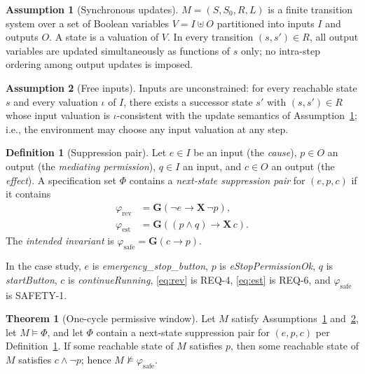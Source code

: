 \documentclass{ieeeaccess}
\theoremstyle{definition}
\newtheorem{definition}{Definition}
\newtheorem{theorem}{Theorem}
\newtheorem{assumption}{Assumption}
\newcommand{\G}{\mathbf{G}}
\newcommand{\X}{\mathbf{X}}
\begin{document}
\begin{assumption}[Synchronous updates]
\label{ass:sync}
$M=(S,S_0,R,L)$ is a finite transition system over a set of Boolean variables $V = I \uplus O$ partitioned into inputs $I$ and outputs $O$. A state is a valuation of $V$. In every transition $(s,s') \in R$, all output variables are updated simultaneously as functions of $s$ only; no intra-step ordering among output updates is imposed.
\end{assumption}

\begin{assumption}[Free inputs]
\label{ass:inputs}
Inputs are unconstrained: for every reachable state $s$ and every valuation $\iota$ of $I$, there exists a successor state $s'$ with $(s,s') \in R$ whose input valuation is $\iota$-consistent with the update semantics of Assumption~\ref{ass:sync}; i.e., the environment may choose any input valuation at any step.
\end{assumption}

\begin{definition}[Suppression pair]
\label{def:pair}
Let $e \in I$ be an input (the \emph{cause}), $p \in O$ an output (the \emph{mediating permission}), $q \in I$ an input, and $c \in O$ an output (the \emph{effect}). A specification set $\Phi$ contains a \emph{next-state suppression pair} for $(e,p,c)$ if it contains
\begin{align}
\varphi_{\mathrm{rev}} &= \G(\neg e \rightarrow \X\,\neg p), \label{eq:rev}\\
\varphi_{\mathrm{est}} &= \G((p \wedge q) \rightarrow \X\,c). \label{eq:est}
\end{align}
The \emph{intended invariant} is $\varphi_{\mathrm{safe}} = \G(c \rightarrow p)$.
\end{definition}

In the case study, $e$ is \textit{emergency\_stop\_button}, $p$ is \textit{eStopPermissionOk}, $q$ is \textit{startButton}, $c$ is \textit{continueRunning}, \eqref{eq:rev} is REQ-4, \eqref{eq:est} is REQ-6, and $\varphi_{\mathrm{safe}}$ is SAFETY-1.

\begin{theorem}[One-cycle permissive window]
\label{thm:gap}
Let $M$ satisfy Assumptions~\ref{ass:sync} and~\ref{ass:inputs}, let $M \models \Phi$, and let $\Phi$ contain a next-state suppression pair for $(e,p,c)$ per Definition~\ref{def:pair}. If some reachable state of $M$ satisfies $p$, then some reachable state of $M$ satisfies $c \wedge \neg p$; hence $M \not\models \varphi_{\mathrm{safe}}$.
\end{theorem}
\end{document}
